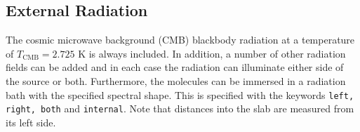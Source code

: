 \documentclass[12pt]{article}
\def\separation {0.5cm}
\begin{document}







\subsection{External Radiation}

The cosmic microwave background (CMB) blackbody radiation at a temperature of
$T_\mathrm{CMB}=2.725$ K is always included. In addition, a number of other
radiation fields can be added and in each case the radiation can illuminate
either side of the source or both. Furthermore, the molecules can be immersed
in a radiation bath with the specified spectral shape. This is specified with
the keywords \texttt{left, right, both} and \texttt{internal}. Note that
distances into the slab are measured from its left side.
\end{document}
